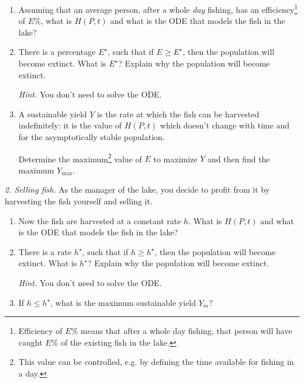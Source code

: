 \begin{enumerate}[label=\emph{(\alph*)}]
\item Assuming that an average person, after a whole \emph{day} fishing, has an efficiency\footnote{Efficiency of $E\%$ means that after a whole day fishing, that person will have caught $E\%$ of the existing fish in the lake.} of $E\%$, what is $H(P,t)$ and what is the ODE that models the fish in the lake?

\item There is a percentage $E^\star$, such that if $E \geq E^\star$, then the population will become extinct. What is $E^\star$? Explain why the population will become extinct.

\emph{Hint.} You don't need to solve the ODE.



\item A sustainable yield $Y$ is the rate at which the fish can be harvested indefinitely: it is the value of $H(P,t)$ which doesn't change with time and for the asymptotically stable population.

Determine the maximum\footnote{This value can be controlled, e.g. by defining the time available for fishing in a day.} value of $E$ to maximize $Y$ and then find the maximum $Y_{\max}$.



\end{enumerate}







\vfill

\emph{2. Selling fish.}
As the manager of the lake, you decide to profit from it by harvesting the fish yourself and selling it. 

\begin{enumerate}[label=\emph{(\alph*)}]
\item Now the fish are harvested at a constant rate $h$. What is $H(P,t)$ and what is the ODE that models the fish in the lake?

\item There is a rate $h^{\star}$, such that if $h \geq h^\star$, then the population will become extinct. What is $h^\star$? Explain why the population will become extinct.

\emph{Hint.} You don't need to solve the ODE.



\item If $h \leq h^\star$, what is the maximum sustainable yield $Y_m$?

\end{enumerate}



